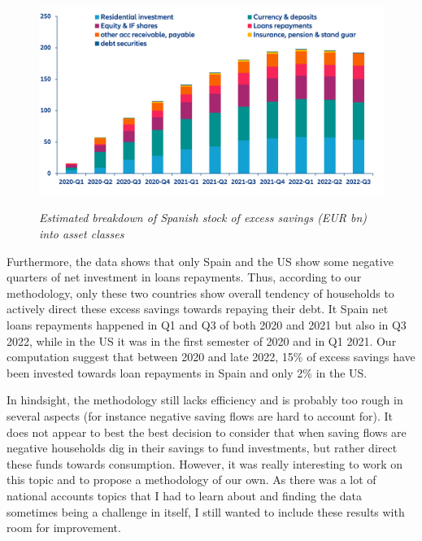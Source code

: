 \begin{figure}[H]
    \centering
    \caption{\textit{Estimated breakdown of Spanish stock of excess savings (EUR bn) into asset classes}}
    \includegraphics[width=.8\textwidth]{Core/1.Savings/img/xSpainAL.png}
    \label{figure:SpainAL}
\end{figure}
Furthermore, the data shows that only Spain and the US show some negative quarters of net investment in loans repayments. Thus, according to our methodology, only these two countries show overall tendency of households to actively direct these excess savings towards repaying their debt. It Spain net loans repayments happened in Q1 and Q3 of both 2020 and 2021 but also in Q3 2022, while in the US it was in the first semester of 2020 and in Q1 2021. Our computation suggest that between 2020 and late 2022, 15\% of excess savings have been invested towards loan repayments in Spain and only 2\% in the US.

In hindsight, the methodology still lacks efficiency and is probably too rough in several aspects (for instance negative saving flows are hard to account for). It does not appear to best the best decision to consider that when saving flows are negative households dig in their savings to fund investments, but rather direct these funds towards consumption. 
However, it was really interesting to work on this topic and to propose a methodology of our own. As there was a lot of national accounts topics that I had to learn about and finding the data sometimes being a challenge in itself, I still wanted to include these results with room for improvement.

\newpage

